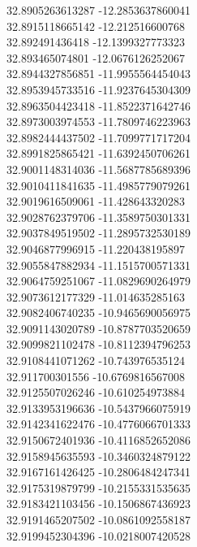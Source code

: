 {32.8905263613287	-12.2853637860041\\
32.8915118665142	-12.212516600768\\
32.892491436418	-12.1399327773323\\
32.893465074801	-12.0676126252067\\
32.8944327856851	-11.9955564454043\\
32.8953945733516	-11.9237645304309\\
32.8963504423418	-11.8522371642746\\
32.8973003974553	-11.7809746223963\\
32.8982444437502	-11.7099771717204\\
32.8991825865421	-11.6392450706261\\
32.9001148314036	-11.5687785689396\\
32.9010411841635	-11.4985779079261\\
32.9019616509061	-11.428643320283\\
32.9028762379706	-11.3589750301331\\
32.9037849519502	-11.2895732530189\\
32.9046877996915	-11.220438195897\\
32.9055847882934	-11.1515700571331\\
32.9064759251067	-11.0829690264979\\
32.9073612177329	-11.014635285163\\
32.9082406740235	-10.9465690056975\\
32.9091143020789	-10.8787703520659\\
32.9099821102478	-10.8112394796253\\
32.9108441071262	-10.743976535124\\
32.911700301556	-10.6769816567008\\
32.9125507026246	-10.610254973884\\
32.9133953196636	-10.5437966075919\\
32.9142341622476	-10.4776066701333\\
32.9150672401936	-10.4116852652086\\
32.9158945635593	-10.3460324879122\\
32.9167161426425	-10.2806484247341\\
32.9175319879799	-10.2155331535635\\
32.9183421103456	-10.1506867436923\\
32.9191465207502	-10.0861092558187\\
32.9199452304396	-10.0218007420528\\
}
